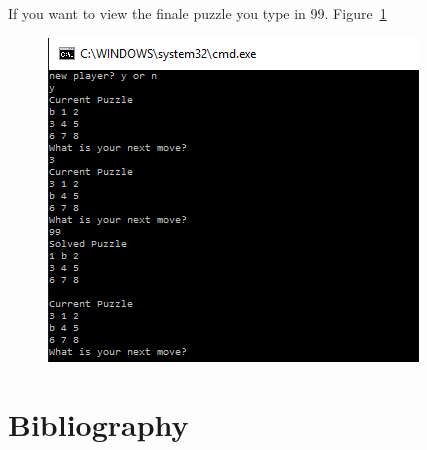 \documentclass[10pt]{article}
\begin{document}
If you want to view the finale puzzle you type in 99. Figure~\ref{prent7}
\begin{figure}
\centering
\includegraphics[scale=0.8]{./Prente/prent7.png}
\caption{}
\label{prent7}
\end{figure}
\section*{Bibliography}
\end{document}
